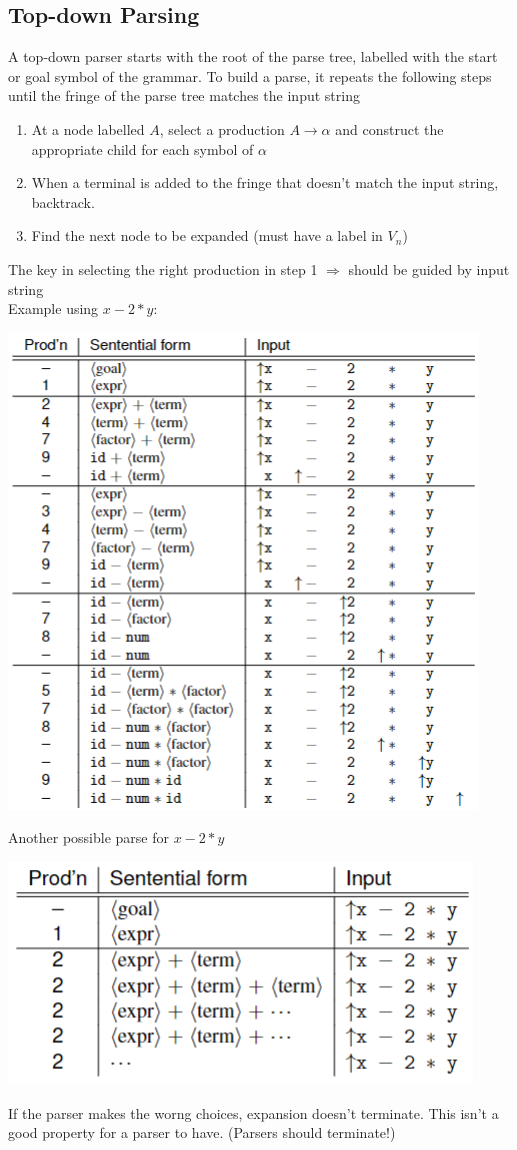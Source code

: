 \documentclass[10pt]{article}
\begin{document}
\subsection*{Top-down Parsing}
A top-down parser starts with the root of the parse tree, labelled with the start or goal symbol of the grammar.  To build a parse, it repeats the following steps until the fringe of the parse tree matches the input string
\begin{enumerate}
    \item At a node labelled $A$, select a production $A \rightarrow \alpha$ and construct the appropriate child for each symbol of $\alpha$
    \item When a terminal is added to the fringe that doesn't match the input string, backtrack.
    \item Find the next node to be expanded (must have a label in $V_n$)
\end{enumerate}
The key in selecting the right production in step 1 $\Rightarrow$ should be guided by input string\\
Example using $x - 2 * y$:
\begin{center}
    \includegraphics*[scale=1]{W1_12.png}
\end{center}
Another possible parse for $x - 2 * y$
\begin{center}
    \includegraphics*[scale=1]{W1_13.png}
\end{center}
If the parser makes the worng choices, expansion doesn't terminate.  This isn't a good property for a parser to have.  (Parsers should terminate!)
\end{document}
